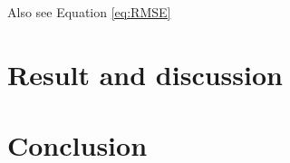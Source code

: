 \documentclass[]{elsarticle} %
\begin{document}
Also see Equation \eqref{eq:RMSE}

\hypertarget{result}{%
\section{Result and discussion}\label{result}}

\hypertarget{conclusion}{%
\section{Conclusion}\label{conclusion}}

\renewcommand\refname{References}

\end{document}
